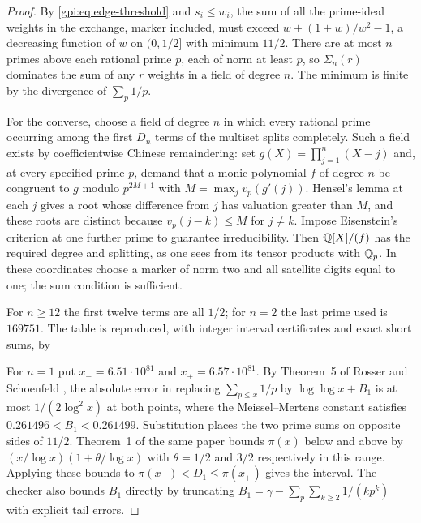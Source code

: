 \begin{proof}
By \eqref{gpi:eq:edge-threshold} and $s_i\le w_i$, the sum of all the prime-ideal weights in
the exchange, marker included, must exceed $w+(1+w)/w^2-1$, a decreasing function of $w$ on
$(0,1/2]$ with minimum $11/2$. There are at most $n$ primes above each rational prime $p$,
each of norm at least $p$, so $\Sigma_n(r)$ dominates the sum of any $r$ weights in a field of
degree $n$. The minimum is finite by the divergence of $\sum_p1/p$.

For the converse, choose a field of degree $n$ in which every rational prime occurring among
the first $D_n$ terms of the multiset splits completely. Such a field exists by coefficientwise
Chinese remaindering: set $g(X)=\prod_{j=1}^n(X-j)$ and, at every specified prime $p$, demand
that a monic polynomial $f$ of degree $n$ be congruent to $g$ modulo $p^{2M+1}$ with
$M=\max_jv_p(g'(j))$. Hensel's lemma at each $j$ gives a root whose difference from $j$ has
valuation greater than $M$, and these roots are distinct because $v_p(j-k)\le M$ for $j\ne k$.
Impose Eisenstein's criterion at one further prime to guarantee irreducibility. Then
$\mathbb{Q}[X]/(f)$ has the required degree and splitting, as one sees from its tensor products with
$\mathbb{Q}_p$. In these coordinates choose a marker of norm two and all satellite digits equal to
one; the sum condition is sufficient.

For $n\ge12$ the first twelve terms are all $1/2$; for $n=2$ the last prime used is $169751$.
The table is reproduced, with integer interval certificates and exact short sums, by

For $n=1$ put $x_-=6.51\cdot10^{81}$ and $x_+=6.57\cdot10^{81}$. By Theorem~5 of Rosser and
Schoenfeld \cite{RosserSchoenfeld1962Approximate}, the absolute error in replacing $\sum_{p\le x}1/p$ by
$\log\log x+B_1$ is at most $1/(2\log^2x)$ at both points, where the Meissel--Mertens
constant satisfies $0.261496<B_1<0.261499$. Substitution places the two prime sums on opposite
sides of $11/2$. Theorem~1 of the same paper bounds $\pi(x)$ below and above by
$(x/\log x)(1+\theta/\log x)$ with $\theta=1/2$ and $3/2$ respectively in this range. Applying
these bounds to $\pi(x_-)<D_1\le\pi(x_+)$ gives the interval. The checker also bounds $B_1$
directly by truncating $B_1=\gamma-\sum_p\sum_{k\ge2}1/(kp^k)$ with explicit tail errors.
\end{proof}


